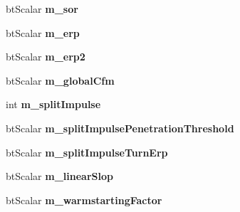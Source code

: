 \begin{DoxyCompactItemize}
\item 
\hypertarget{structbt_contact_solver_info_data_a3410957ca045f33c56fa7f70d49c4e1c}{bt\+Scalar {\bfseries m\+\_\+sor}}\label{structbt_contact_solver_info_data_a3410957ca045f33c56fa7f70d49c4e1c}

\item 
\hypertarget{structbt_contact_solver_info_data_accb516e65efeeed546ce98453b57532d}{bt\+Scalar {\bfseries m\+\_\+erp}}\label{structbt_contact_solver_info_data_accb516e65efeeed546ce98453b57532d}

\item 
\hypertarget{structbt_contact_solver_info_data_aff9d61b068016f0c2eac0f858dcd1d45}{bt\+Scalar {\bfseries m\+\_\+erp2}}\label{structbt_contact_solver_info_data_aff9d61b068016f0c2eac0f858dcd1d45}

\item 
\hypertarget{structbt_contact_solver_info_data_ab527236636f1cc7827a20aad92345f9b}{bt\+Scalar {\bfseries m\+\_\+global\+Cfm}}\label{structbt_contact_solver_info_data_ab527236636f1cc7827a20aad92345f9b}

\item 
\hypertarget{structbt_contact_solver_info_data_a51a0186cf57ca7931d81d6ad1391c121}{int {\bfseries m\+\_\+split\+Impulse}}\label{structbt_contact_solver_info_data_a51a0186cf57ca7931d81d6ad1391c121}

\item 
\hypertarget{structbt_contact_solver_info_data_a3a520832d80e1125c2ac74e4d08a7d48}{bt\+Scalar {\bfseries m\+\_\+split\+Impulse\+Penetration\+Threshold}}\label{structbt_contact_solver_info_data_a3a520832d80e1125c2ac74e4d08a7d48}

\item 
\hypertarget{structbt_contact_solver_info_data_abef654f8a7434fbaa9e11f509ae98565}{bt\+Scalar {\bfseries m\+\_\+split\+Impulse\+Turn\+Erp}}\label{structbt_contact_solver_info_data_abef654f8a7434fbaa9e11f509ae98565}

\item 
\hypertarget{structbt_contact_solver_info_data_a9b28607cd2bb4d8449041e4feb9febe9}{bt\+Scalar {\bfseries m\+\_\+linear\+Slop}}\label{structbt_contact_solver_info_data_a9b28607cd2bb4d8449041e4feb9febe9}

\item 
\hypertarget{structbt_contact_solver_info_data_a826d63892ebc1328d85cb2f9cd667da4}{bt\+Scalar {\bfseries m\+\_\+warmstarting\+Factor}}\label{structbt_contact_solver_info_data_a826d63892ebc1328d85cb2f9cd667da4}


\end{DoxyCompactItemize}

